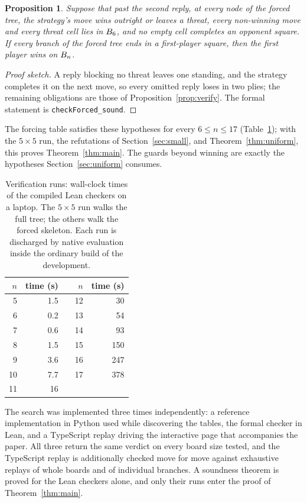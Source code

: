 \documentclass[11pt]{amsart}
\newtheorem{proposition}[theorem]{Proposition}
\theoremstyle{definition}
\theoremstyle{remark}
\begin{document}
\begin{proposition}\label{prop:forced}
Suppose that past the second reply, at every node of the forced
tree, the strategy's move wins outright or leaves a threat, every
non-winning move and every threat cell lies in $B_6$, and no
empty cell completes an opponent square. If every branch of the
forced tree ends in a first-player square, then the first player
wins on $B_n$.
\end{proposition}

\begin{proof}[Proof sketch]
A reply blocking no threat leaves one standing, and the strategy
completes it on the next move, so every omitted reply loses in two
plies; the remaining obligations are those of
Proposition~\ref{prop:verify}. The formal statement is
\texttt{checkForced\_sound}.
\end{proof}

The forcing table satisfies these hypotheses for every
$6 \le n \le 17$ (Table~\ref{tab:runs}); with the $5 \times 5$ run,
the refutations of Section~\ref{sec:small}, and
Theorem~\ref{thm:uniform}, this proves Theorem~\ref{thm:main}. The
guards beyond winning are exactly the hypotheses
Section~\ref{sec:uniform} consumes.

\begin{table}[ht]
\centering
\begin{tabular}{rrcrr}
\toprule
$n$ & time (s) & & $n$ & time (s) \\
\midrule
5 & 1.5 & & 12 & 30 \\
6 & 0.2 & & 13 & 54 \\
7 & 0.6 & & 14 & 93 \\
8 & 1.5 & & 15 & 150 \\
9 & 3.6 & & 16 & 247 \\
10 & 7.7 & & 17 & 378 \\
11 & 16 & & & \\
\bottomrule
\end{tabular}
\medskip
\caption{Verification runs: wall-clock times of the compiled Lean
checkers on a laptop. The $5 \times 5$ run walks the full tree; the
others walk the forced skeleton. Each run is discharged by native
evaluation inside the ordinary build of the development.}
\label{tab:runs}
\end{table}

The search was implemented three times independently: a reference
implementation in Python used while discovering the tables, the formal
checker in Lean, and a TypeScript replay driving the interactive page
that accompanies the paper. All three return the same verdict on
every board size tested, and the TypeScript replay is additionally
checked move for move against exhaustive replays of whole boards and
of individual branches. A soundness theorem is proved for the Lean
checkers alone, and only their runs enter the proof of
Theorem~\ref{thm:main}.
\end{document}
